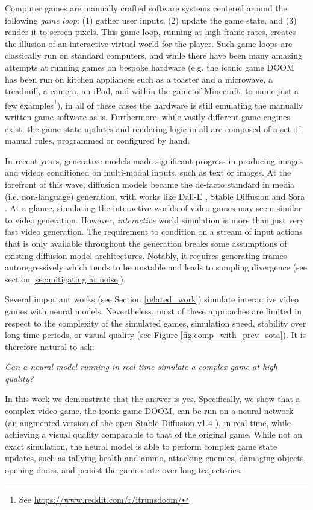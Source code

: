\documentclass{article} %
\begin{document}
Computer games are manually crafted software systems centered around the following \emph{game loop}: (1) gather user inputs, (2) update the game state, and (3) render it to screen pixels.
This game loop, running at high frame rates, creates the illusion of an interactive virtual world for the player.
Such game loops are classically run on standard computers, and while there have been many amazing attempts at running games on bespoke hardware (e.g. the iconic game DOOM has been run on kitchen appliances such as a toaster and a microwave, a treadmill, a camera, an iPod, and within the game of Minecraft, to name just a few examples\footnote{See \url{https://www.reddit.com/r/itrunsdoom/}}), in all of these cases the hardware is still emulating the manually written game software as-is. Furthermore, while vastly different game engines exist, the game state updates and rendering logic in all are composed of a set of manual rules, programmed or configured by hand.

In recent years, generative models made significant progress in producing images and videos conditioned on multi-modal inputs, such as text or images. At the forefront of this wave, diffusion models became the de-facto standard in media (i.e. non-language) generation, with works like Dall-E \citep{ramesh2022hierarchical}, Stable Diffusion \citep{rombach2022high} and Sora \citep{videoworldsimulators2024}. At a glance, simulating the interactive worlds of video games may seem similar to video generation. However, \textit{interactive} world simulation is more than just very fast video generation. The requirement to condition on a stream of input actions that is only available throughout the generation breaks some assumptions of existing diffusion model architectures. Notably, it requires generating frames autoregressively which tends to be unstable and leads to sampling divergence (see section \ref{sec:mitigating ar noise}).

Several important works \citep{ha2018worldmodels,Kim2020_GameGan,bruce2024genie} (see Section \ref{related_work}) simulate interactive video games with neural models. Nevertheless, most of these approaches are limited in respect to the complexity of the simulated games, simulation speed, stability over long time periods, or visual quality (see Figure \ref{fig:comp_with_prev_sota}).
It is therefore natural to ask:

\textit{Can a neural model running in real-time simulate a complex game at high quality?}

In this work we demonstrate that the answer is yes. Specifically, we show that a complex video game, the iconic game DOOM, can be run  on a neural network (an augmented version of the open Stable Diffusion v1.4 \citep{rombach2022high}),
in real-time, while achieving a visual quality comparable to that of the original game.
While not an exact simulation, the neural model is able to perform complex game state updates, such as tallying health and ammo, attacking enemies, damaging objects, opening doors, and persist the game state over long trajectories.
\end{document}
